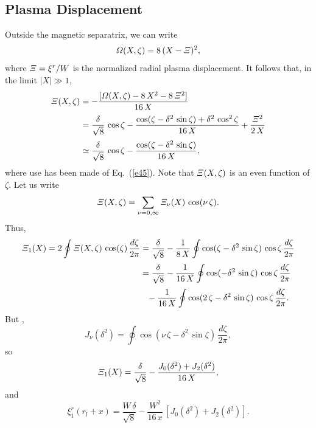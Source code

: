 \documentclass{iopjournal}
\begin{document}
{\subsection{Plasma Displacement}
Outside the magnetic separatrix, we can write
\begin{equation}
{\mit\Omega}(X,\zeta) = 8\,(X-{\mit\Xi})^2,
\end{equation}
where ${\mit\Xi}= \xi^r/W$ is the normalized radial plasma displacement. It follows that, in the limit $|X|\gg 1$, 
\begin{align}
{\mit\Xi}(X,\zeta)&= -\frac{[{\mit\Omega}(X,\zeta)-8\,X^2 - 8\,{\mit\Xi}^2]}{16\,X}\nonumber\\[0.5ex]
&=\frac{\delta}{\sqrt{8}}\,\cos\zeta - \frac{\cos(\zeta-\delta^2\,\sin\zeta) +\delta^2\,\cos^2\zeta}{16\,X}+ \frac{{\mit\Xi}^2}{2\,X}\nonumber\\[0.5ex]
&\simeq \frac{\delta}{\sqrt{8}}\,\cos\zeta- \frac{\cos(\zeta-\delta^2\,\sin\zeta)}{16\,X},
\end{align}
where use has been made of Eq.~(\ref{e45}).
Note that ${\mit\Xi}(X,\zeta)$ is an even function of $\zeta$. 
Let us write
\begin{equation}
{\mit\Xi}(X,\zeta)= \sum_{\nu=0,\infty} {\mit\Xi}_\nu(X)\,\cos(\nu\,\zeta).
\end{equation}
Thus,
\begin{align}
{\mit\Xi}_1(X) =2 \oint {\mit\Xi}(X,\zeta)\,\cos(\zeta)\,\frac{d\zeta}{2\pi} &= \frac{\delta}{\sqrt{8}}-\frac{1}{8\,X}\oint\cos(\zeta-\delta^2\,\sin\zeta)\,\cos\zeta\,\frac{d\zeta}{2\pi}\nonumber \\[0.5ex]
&=\frac{\delta}{\sqrt{8}} -\frac{1}{16\,X}\oint\cos(-\delta^2\,\sin\zeta)\,\cos\zeta\,\frac{d\zeta}{2\pi}\nonumber\\[0.5ex]
&\phantom{=}- \frac{1}{16\,X}\oint\cos(2\,\zeta-\delta^2\,\sin\zeta)\,\cos\zeta\,\frac{d\zeta}{2\pi}.
\end{align}
But \cite{bc,grx}, 
\begin{equation}
J_\nu(\delta^2) = \oint\cos(\nu\,\zeta-\delta^2\,\sin\zeta)\,\frac{d\zeta}{2\pi},
\end{equation}
so
\begin{equation}
{\mit\Xi}_1(X) =\frac{\delta}{\sqrt{8}} - \frac{J_0(\delta^2) + J_2(\delta^2)}{16\,X},
\end{equation}
and
\begin{equation}\label{ea}
\xi^r_1(r_{l}+x) = \frac{W\,\delta}{\sqrt{8}} - \frac{W^2}{16\,x}\,[J_0(\delta^2)+ J_2(\delta^2)].
\end{equation}

}
\end{document}
